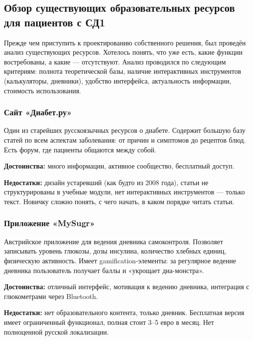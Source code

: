 \documentclass[14pt, a4paper]{extarticle}
\begin{document}
\subsection{Обзор существующих образовательных ресурсов для пациентов с СД1}

\noindent Прежде чем приступить к проектированию собственного решения, был проведён анализ существующих ресурсов. Хотелось понять, что уже есть, какие функции востребованы, а какие — отсутствуют. Анализ проводился по следующим критериям: полнота теоретической базы, наличие интерактивных инструментов (калькуляторы, дневники), удобство интерфейса, актуальность информации, стоимость использования.

\subsubsection{Сайт «Диабет.ру»}

\noindent Один из старейших русскоязычных ресурсов о диабете. Содержит большую базу статей по всем аспектам заболевания: от причин и симптомов до рецептов блюд. Есть форум, где пациенты общаются между собой.

\medskip
\noindent \textbf{Достоинства:} много информации, активное сообщество, бесплатный доступ.

\medskip
\noindent \textbf{Недостатки:} дизайн устаревший (как будто из 2008 года), статьи не структурированы в учебные модули, нет интерактивных инструментов — только текст. Новичку сложно понять, с чего начать, в каком порядке читать статьи.

\subsubsection{Приложение «MySugr»}

\noindent Австрийское приложение для ведения дневника самоконтроля. Позволяет записывать уровень глюкозы, дозы инсулина, количество хлебных единиц, физическую активность. Имеет gamification-элементы: за регулярное ведение дневника пользователь получает баллы и «укрощает диа-монстра».

\medskip
\noindent \textbf{Достоинства:} отличный интерфейс, мотивация к ведению дневника, интеграция с глюкометрами через Bluetooth.

\medskip
\noindent \textbf{Недостатки:} нет образовательного контента, только дневник. Бесплатная версия имеет ограниченный функционал, полная стоит 3–5 евро в месяц. Нет полноценной русской локализации.
\end{document}
